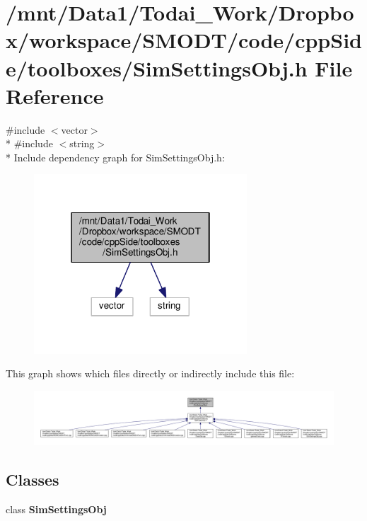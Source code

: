 \section{/mnt/\-Data1/\-Todai\-\_\-\-Work/\-Dropbox/workspace/\-S\-M\-O\-D\-T/code/cpp\-Side/toolboxes/\-Sim\-Settings\-Obj.h File Reference}
\label{_sim_settings_obj_8h}
{\ttfamily \#include $<$vector$>$}\\*
{\ttfamily \#include $<$string$>$}\\*
Include dependency graph for Sim\-Settings\-Obj.\-h\-:\nopagebreak
\begin{figure}[H]
\begin{center}
\leavevmode
\includegraphics[width=226pt]{_sim_settings_obj_8h__incl}
\end{center}
\end{figure}
This graph shows which files directly or indirectly include this file\-:\nopagebreak
\begin{figure}[H]
\begin{center}
\leavevmode
\includegraphics[width=350pt]{_sim_settings_obj_8h__dep__incl}
\end{center}
\end{figure}
\subsection*{Classes}
\begin{DoxyCompactItemize}
\item 
class {\bf Sim\-Settings\-Obj}
\end{DoxyCompactItemize}
